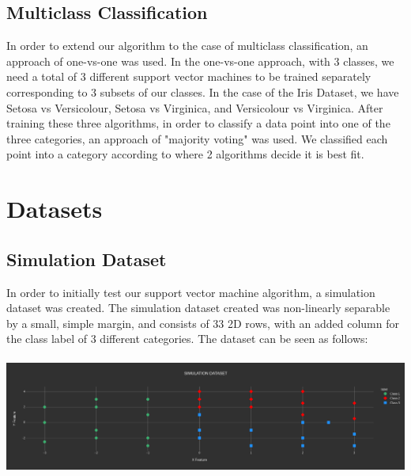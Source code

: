 \documentclass[12pt]{article}%
\begin{document}
	\subsection{Multiclass Classification}
	In order to extend our algorithm to the case of multiclass classification, an approach of one-vs-one was used.  In the one-vs-one approach, with 3 classes, we need a total of 3 different support vector machines to be trained separately corresponding to 3 subsets of our classes.  In the case of the Iris Dataset, we have Setosa vs Versicolour, Setosa vs Virginica, and Versicolour vs Virginica.  After training these three algorithms, in order to classify a data point into one of the three categories, an approach of "majority voting" was used.  We classified each point into a category according to where 2 algorithms decide it is best fit.
	
	\section{Datasets}
	
	\subsection{Simulation Dataset}
	In order to initially test our support vector machine algorithm, a simulation dataset was created.  The simulation dataset created was non-linearly separable by a small, simple margin, and consists of 33 2D rows, with an added column for the class label of 3 different categories.  The dataset can be seen as follows:\\\\
	\indent\indent
	\includegraphics[scale=.2]{./simulation.png}
	
\end{document}
